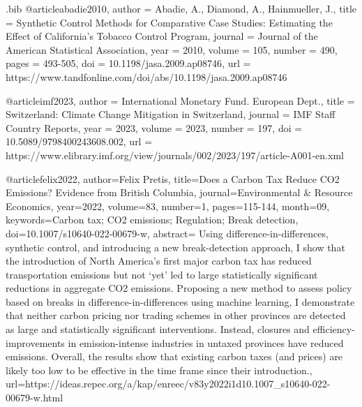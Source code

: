 \begin{filecontents}{.bib}
@article{abadie2010,
  author = {{Abadie, A., Diamond, A., Hainmueller, J.}},
  title = {Synthetic Control Methods for Comparative Case Studies: Estimating the Effect of California’s Tobacco Control Program},
  journal = {Journal of the American Statistical Association},
  year = {2010},
  volume = {105},
  number = {490},
  pages = {493-505},
  doi = {10.1198/jasa.2009.ap08746},
  url = {https://www.tandfonline.com/doi/abs/10.1198/jasa.2009.ap08746}
}

@article{imf2023,
  author = {{International Monetary Fund. European Dept.}},
  title = {Switzerland: Climate Change Mitigation in Switzerland},
  journal = {IMF Staff Country Reports},
  year = {2023},
  volume = {2023},
  number = {197},
  doi = {10.5089/9798400243608.002},
  url = {https://www.elibrary.imf.org/view/journals/002/2023/197/article-A001-en.xml}
}


@article{felix2022,
  author={{Felix Pretis}},
  title={{Does a Carbon Tax Reduce CO2 Emissions? Evidence from British Columbia}},
  journal={Environmental \& Resource Economics},
  year=2022,
  volume={83},
  number={1},
  pages={115-144},
  month={09},
  keywords={Carbon tax; CO2 emissions; Regulation; Break detection},
  doi={10.1007/s10640-022-00679-w},
  abstract={ Using difference-in-differences, synthetic control, and introducing a new break-detection approach, I show that the introduction of North America’s first major carbon tax has reduced transportation emissions but not ‘yet’ led to large statistically significant reductions in aggregate CO2 emissions. Proposing a new method to assess policy based on breaks in difference-in-differences using machine learning, I demonstrate that neither carbon pricing nor trading schemes in other provinces are detected as large and statistically significant interventions. Instead, closures and efficiency-improvements in emission-intense industries in untaxed provinces have reduced emissions. Overall, the results show that existing carbon taxes (and prices) are likely too low to be effective in the time frame since their introduction.},
  url={{https://ideas.repec.org/a/kap/enreec/v83y2022i1d10.1007_s10640-022-00679-w.html}}
}


\end{filecontents}
